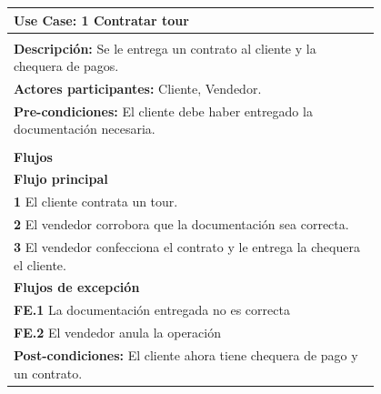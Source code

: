 \documentclass[12pt,a4paper,titlepage,oneside]{article}
\begin{document}
\begin{tabular}{| l | p{0.8\linewidth} |} \hline
	\multicolumn{2}{|p{0.8\linewidth}|}{\textbf{Use Case:} 1 Contratar tour} \\ \hline
	\multicolumn{2}{|c|}{} \\ \hline
	\multicolumn{2}{|p{0.8\linewidth}|}{\textbf{Descripci\'on:} Se le entrega un contrato al cliente y  la chequera de pagos.} \\ \hline
	\multicolumn{2}{|p{0.8\linewidth}|}{\textbf{Actores participantes:} Cliente, Vendedor.} \\ \hline
	\multicolumn{2}{|p{0.8\linewidth}|}{\textbf{Pre-condiciones:} El cliente debe haber entregado la documentación necesaria.} \\ \hline
	\multicolumn{2}{|c|}{} \\ \hline
	\multicolumn{2}{|p{0.8\linewidth}|}{\textbf{Flujos}} \\ \hline
	\multicolumn{2}{|p{0.8\linewidth}|}{\textbf{Flujo principal}} \\ \hline
	\multicolumn{2}{|p{0.8\linewidth}|}{\textbf{1} El cliente contrata un tour.} \\ \hline
	\multicolumn{2}{|p{0.8\linewidth}|}{\textbf{2} El vendedor corrobora que la documentación sea correcta.} \\ \hline
	\multicolumn{2}{|p{0.8\linewidth}|}{\textbf{3} El vendedor confecciona el contrato y le entrega la chequera el 	cliente.} \\ \hline
	\multicolumn{2}{|p{0.8\linewidth}|}{\textbf{Flujos de excepci\'on}} \\ \hline
	\multicolumn{2}{|p{0.8\linewidth}|}{\textbf{FE.1} La documentación entregada no es correcta} \\ \hline
	\multicolumn{2}{|p{0.8\linewidth}|}{\textbf{FE.2} El vendedor anula la operación} \\ \hline
	\multicolumn{2}{|p{0.8\linewidth}|}{\textbf{Post-condiciones:} El cliente ahora tiene chequera de pago y un contrato.}\\ \hline
\end{tabular} \\\\
 \\\\
\end{document}
